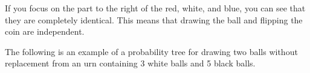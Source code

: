 \documentclass{ximera}
\begin{document}
\begin{image}
\end{image}


If you focus on the part to the right of the red, white, and blue, you can see that they are completely identical. This means that drawing the ball and flipping the coin are independent.

The following is an example of a probability tree for drawing two balls without replacement from an urn containing 3 white balls and 5 black balls.
\end{document}
